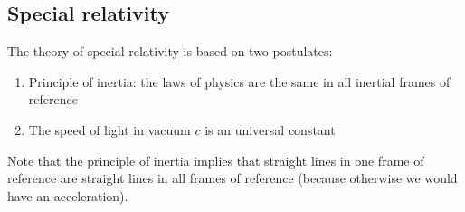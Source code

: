 \documentclass[10pt]{extarticle}
\begin{document}
\subsection{Special relativity}

The theory of special relativity is based on two postulates:

\begin{enumerate}
    \item Principle of inertia: the laws of physics are the same in all inertial frames of reference
    \item The speed of light in vacuum $c$ is an universal constant
\end{enumerate}

Note that the principle of inertia implies that straight lines in one frame of reference are straight lines in all frames of reference (because otherwise we would have an acceleration).
\end{document}
